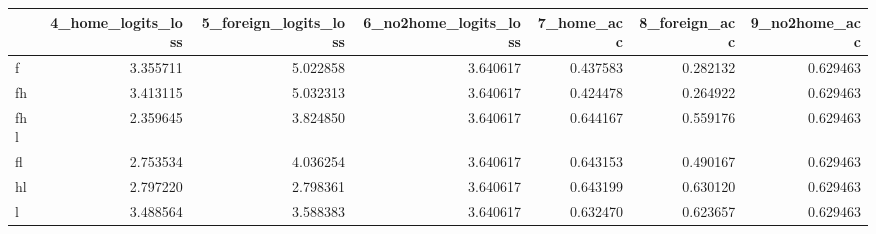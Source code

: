 \begin{tabular}{lrrrrrr}
\toprule
 & 4_home_logits_loss & 5_foreign_logits_loss & 6_no2home_logits_loss & 7_home_acc & 8_foreign_acc & 9_no2home_acc \\
\midrule
f & 3.355711 & 5.022858 & 3.640617 & 0.437583 & 0.282132 & 0.629463 \\
fh & 3.413115 & 5.032313 & 3.640617 & 0.424478 & 0.264922 & 0.629463 \\
fhl & 2.359645 & 3.824850 & 3.640617 & 0.644167 & 0.559176 & 0.629463 \\
fl & 2.753534 & 4.036254 & 3.640617 & 0.643153 & 0.490167 & 0.629463 \\
hl & 2.797220 & 2.798361 & 3.640617 & 0.643199 & 0.630120 & 0.629463 \\
l & 3.488564 & 3.588383 & 3.640617 & 0.632470 & 0.623657 & 0.629463 \\
\bottomrule
\end{tabular}
